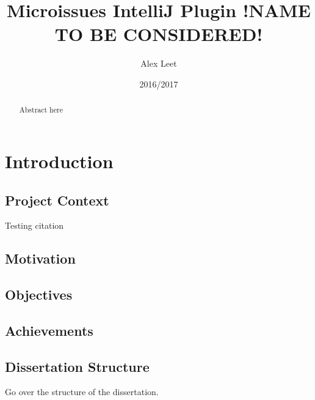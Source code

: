 \documentclass{4thYearProject}
\begin{document}
\title{Microissues IntelliJ Plugin !NAME TO BE CONSIDERED!}
\author{Alex Leet}
\date{2016/2017}
\maketitle

\begin{abstract}
Abstract here
\end{abstract}

\educationalconsent
%
%
\tableofcontents

\chapter{Introduction}

\section{Project Context}

Testing citation \cite{microissues}


\section{Motivation}


\section{Objectives}


\section{Achievements}


\section{Dissertation Structure}

Go over the structure of the dissertation.
\end{document}
